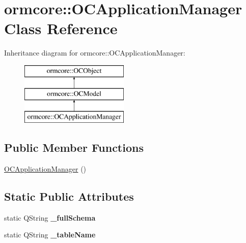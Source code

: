 \hypertarget{classormcore_1_1_o_c_application_manager}{
\section{ormcore\-:\-:\-O\-C\-Application\-Manager \-Class \-Reference}
\label{classormcore_1_1_o_c_application_manager}
}
\-Inheritance diagram for ormcore\-:\-:\-O\-C\-Application\-Manager\-:\begin{figure}[H]
\begin{center}
\leavevmode
\includegraphics[height=3.000000cm]{classormcore_1_1_o_c_application_manager}
\end{center}
\end{figure}
\subsection*{\-Public \-Member \-Functions}
\begin{DoxyCompactItemize}
\item 
\hyperlink{classormcore_1_1_o_c_application_manager_ae9f11ee127603b9e35fd40d99620a293}{\-O\-C\-Application\-Manager} ()
\end{DoxyCompactItemize}
\subsection*{\-Static \-Public \-Attributes}
\begin{DoxyCompactItemize}
\item 
\hypertarget{classormcore_1_1_o_c_application_manager_adc5e1351b917d025c0d34ec513f99bbf}{
static \-Q\-String {\bfseries \-\_\-full\-Schema}}
\label{classormcore_1_1_o_c_application_manager_adc5e1351b917d025c0d34ec513f99bbf}

\item 
\hypertarget{classormcore_1_1_o_c_application_manager_aed2df83911c3b30b50b27e0c85898314}{
static \-Q\-String {\bfseries \-\_\-table\-Name}}
\label{classormcore_1_1_o_c_application_manager_aed2df83911c3b30b50b27e0c85898314}

\end{DoxyCompactItemize}


